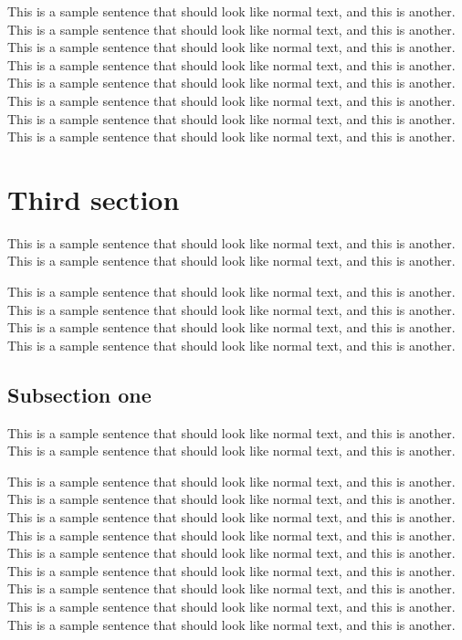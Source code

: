This is a sample sentence that should look like normal text, and this
is another. This is a sample sentence that should look like normal
text, and this is another. This is a sample sentence that should look
like normal text, and this is another. This is a sample sentence that
should look like normal text, and this is another. This is a sample
sentence that should look like normal text, and this is another. This
is a sample sentence that should look like normal text, and this is
another. This is a sample sentence that should look like normal text,
and this is another. This is a sample sentence that should look like
normal text, and this is another.

\section{Third section}

This is a sample sentence that should look like normal text, and this
is another. This is a sample sentence that should look like normal
text, and this is another.

This is a sample sentence that should look like normal text, and this
is another. This is a sample sentence that should look like normal
text, and this is another. This is a sample sentence that should look
like normal text, and this is another. This is a sample sentence that
should look like normal text, and this is another.

\subsection{Subsection one}

This is a sample sentence that should look like normal text, and this
is another. This is a sample sentence that should look like normal
text, and this is another.

This is a sample sentence that should look like normal text, and this
is another. This is a sample sentence that should look like normal
text, and this is another. This is a sample sentence that should look
like normal text, and this is another. This is a sample sentence that
should look like normal text, and this is another. This is a sample
sentence that should look like normal text, and this is another. This
is a sample sentence that should look like normal text, and this is
another. This is a sample sentence that should look like normal text,
and this is another. This is a sample sentence that should look like
normal text, and this is another. This is a sample sentence that
should look like normal text, and this is another.

